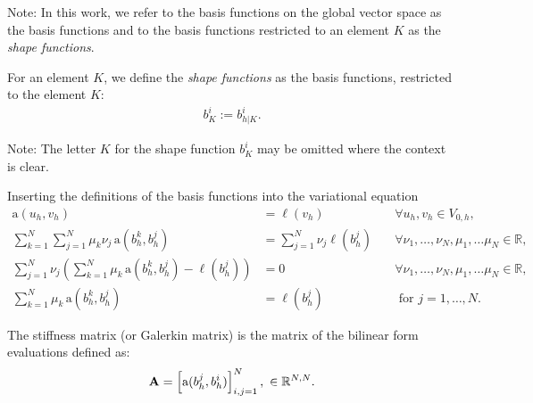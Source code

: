 Note: In this work, we refer to the basis functions on the global vector space as the
basis functions and to the basis functions restricted to an element $K$ as the
\emph{shape functions}.

\begin{definition}
    For an element $K$, we define the \emph{shape functions} as the basis functions,
    restricted to the element $K$:
    \begin{align}
        b^i_K := b^i_{h|K}.
    \end{align}
\end{definition}
Note: The letter $K$ for the shape function $b^i_K$ may be omitted where the context is clear.

Inserting the definitions of the basis functions into the variational equation %
\begin{align}
    \mathrm{a}(u_h, v_h)                                                                                            & = \ell(v_h) \quad                                 & \forall u_h, v_h \in V_{0,h},                                   \\
    \sum_{k=1}^N \sum_{j=1}^N \mu_k \nu_j \, \mathrm{a}\left(b_h^k, b_h^j\right)                                    & = \sum_{j=1}^N \nu_j \ell\left(b_h^j\right) \quad & \forall \nu_1, \dots, \nu_N, \mu_1, \dots \mu_N \in \mathbb{R}, \\
    \sum_{j=1}^N \nu_j\left(\sum_{k=1}^N \mu_k \, \mathrm{a}\left(b_h^k, b_h^j\right)-\ell\left(b_h^j\right)\right) & = 0 \quad                                         & \forall \nu_1, \dots, \nu_N, \mu_1, \dots \mu_N \in \mathbb{R}, \\
    \sum_{k=1}^N \mu_k \, \mathrm{a}\left(b_h^k, b_h^j\right)                                                       & = \ell\left(b_h^j\right)                          & \text { for } j=1, \dots, N.
\end{align}

\begin{definition}
    \label{def:stiffness_mat}
    The stiffness matrix (or Galerkin matrix) is the matrix of the bilinear form evaluations
    defined as:
    \begin{align}
        \mat{A} = \left[ \mathrm{a}(b_h^j, b_h^i) \right]^N_{i,j=1}, \ \in \R^{N,N}.
        \label{eq:stiffness_mat}
    \end{align}
\end{definition}

